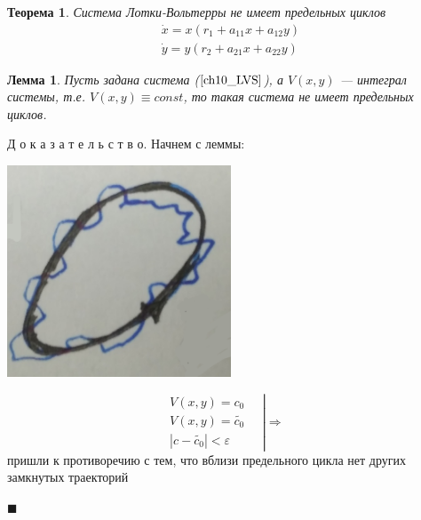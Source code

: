 \documentclass[oneside, final, 12pt]{article}
\theoremstyle{def}
\theoremstyle{th}
\newtheorem{theorem}{Теорема}[section]
\newtheorem{lemma}{Лемма}[section]
\theoremstyle{rem}
\renewenvironment{proof}{\par Д о к а з а т е л ь с т в о.}{\hfill$\blacksquare$}
\numberwithin{figure}{section}
\numberwithin{equation}{section}
\begin{document}
	\begin{theorem}
		Система Лотки-Вольтерры не имеет предельных циклов
		\begin{equation}
			\begin{gathered}
				\dot{x} = x(r_1+a_{11}x+a_{12}y) \\
				\dot{y} = y(r_2+a_{21}x+a_{22}y)
			\end{gathered}	\label{ch10_LVS}
		\end{equation}
	\end{theorem}
	\begin{lemma}
			Пусть задана система ($\ref{ch10_LVS}$), а $V(x,y)$ --- интеграл системы, 
			т.е. \newline $V(x,y) \equiv const$, то такая система не имеет предельных циклов. 
	\end{lemma} 
	\begin{proof}{ Начнем с леммы:} \vspace{3mm}
	
		\begin{minipage}{0.3\textwidth}
			\begin{center} \includegraphics[width=0.5\textwidth]{pict/pict_5.png} \end{center} 
		\end{minipage}
		\begin{minipage}{0.58\textwidth}
			$$\left.
				\begin{gathered}
					V(x,y) = c_0 \\
					V(x,y) = \tilde{c_0} \\
					|c-\tilde{c_0}| < \varepsilon
				\end{gathered} \quad \right|\Rightarrow \quad 
			$$ пришли к противоречию с тем, что вблизи предельного цикла нет других замкнутых траекторий
		\end{minipage}		
		
	\end{proof}
\end{document}
